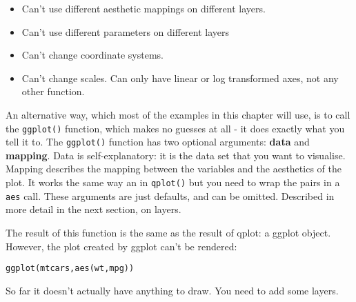 \begin{itemize}
  \item Can't use different aesthetic mappings on different layers.  
  \item Can't use different parameters on different layers
  \item Can't change coordinate systems.  
  \item Can't change scales.  Can only have linear or log transformed axes, not any other function.
\end{itemize}

An alternative way, which most of the examples in this chapter will use, is to call the {\tt ggplot()} function, which makes no guesses at all - it does exactly what you tell it to.  The {\tt ggplot()} function has two optional arguments: {\bf data} and {\bf mapping}.  Data is self-explanatory: it is the data set that you want to visualise.  Mapping describes the mapping between the variables and the aesthetics of the plot.  It works the same way an in {\tt qplot()} but you need to wrap the pairs in a {\tt aes} call.  These arguments are just defaults, and can be omitted.  Described in more detail in the next section, on layers.

The result of this function is the same as the result of qplot: a ggplot object.  However, the plot created by ggplot can't be rendered:

\begin{alltt}
  ggplot(mtcars, aes(wt, mpg))
\end{alltt}

So far it doesn't actually have anything to draw.  You need to add some layers.



